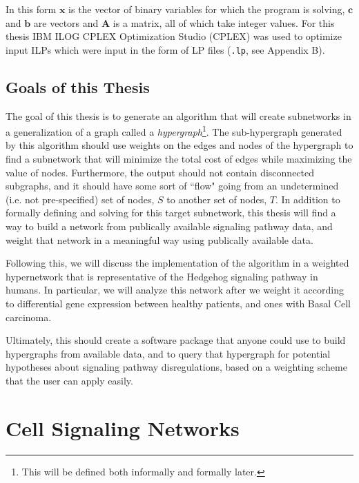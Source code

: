 \documentclass[12pt,twoside]{reedthesis}
\theoremstyle{definition}
\begin{document}
  In this form $\mathbf{x}$ is the vector of binary variables for which the program is solving, $\mathbf{c}$ and $\mathbf{b}$ are vectors and $\mathbf{A}$ is a matrix, all of which take integer values. For this thesis IBM ILOG CPLEX Optimization Studio (CPLEX) was used to optimize input ILPs which were input in the form of LP files (\texttt{.lp}, see Appendix B).

 \section{Goals of this Thesis}

 The goal of this thesis is to generate an algorithm that will create subnetworks in a generalization of a graph called a \textit{hypergraph}\footnote{This will be defined both informally and formally later.}. The sub-hypergraph generated by this algorithm should use weights on the edges and nodes of the hypergraph to find a subnetwork that will minimize the total cost of edges while maximizing the value of nodes. Furthermore, the output should not contain disconnected subgraphs, and it should have some sort of ``flow" going from an undetermined (i.e. not pre-specified) set of nodes, $S$ to another set of nodes, $T$. In addition to formally defining and solving for this target subnetwork, this thesis will find a way to build a network from publically available signaling pathway data, and weight that network in a meaningful way using publically available data.\par

 Following this, we will discuss the implementation of the algorithm in a weighted hypernetwork that is representative of the Hedgehog signaling pathway in humans. In particular, we will analyze this network after we weight it according to differential gene expression between healthy patients, and ones with Basal Cell carcinoma.

 Ultimately, this should create a software package that anyone could use to build hypergraphs from available data, and to query that hypergraph for potential hypotheses about signaling pathway disregulations, based on a weighting scheme that the user can apply easily.\par

\chapter{Cell Signaling Networks}
\end{document}
